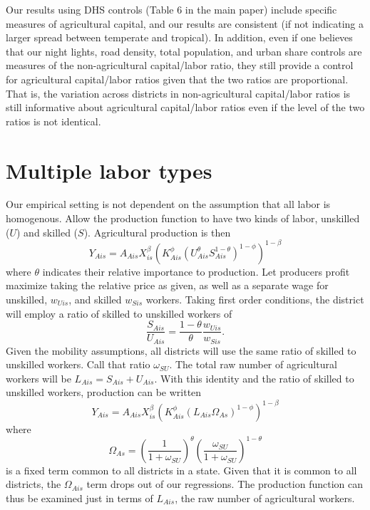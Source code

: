 \documentclass[11pt]{article}
\begin{document}
Our results using DHS controls (Table 6 in the main paper) include specific measures of agricultural capital, and our results are consistent (if not indicating a larger spread between temperate and tropical). In addition, even if one believes that our night lights, road density, total population, and urban share controls are measures of the non-agricultural capital/labor ratio, they still provide a control for agricultural capital/labor ratios given that the two ratios are proportional. That is, the variation across districts in non-agricultural capital/labor ratios is still informative about agricultural capital/labor ratios even if the level of the two ratios is not identical.

\section{Multiple labor types}
Our empirical setting is not dependent on the assumption that all labor is homogenous. Allow the production function to have two kinds of labor, unskilled ($U$) and skilled ($S$). Agricultural production is then
\begin{equation}
Y_{Ais} = A_{Ais} X_{is}^{\beta} \left(K_{Ais}^{\phi}(U_{Ais}^{\theta}S_{Ais}^{1-\theta})^{1-\phi}\right)^{1-\beta} 
\end{equation}
where $\theta$ indicates their relative importance to production. Let producers profit maximize taking the relative price as given, as well as a separate wage for unskilled, $w_{Uis}$, and skilled $w_{Sis}$ workers. Taking first order conditions, the district will employ a ratio of skilled to unskilled workers of
\begin{equation}
    \frac{S_{Ais}}{U_{Ais}} = \frac{1-\theta}{\theta}\frac{w_{Uis}}{w_{Sis}}.
\end{equation}
Given the mobility assumptions, all districts will use the same ratio of skilled to unskilled workers. Call that ratio $\omega_{SU}$. The total raw number of agricultural workers will be $L_{Ais} = S_{Ais} + U_{Ais}$. With this identity and the ratio of skilled to unskilled workers, production can be written
\begin{equation}
    Y_{Ais} = A_{Ais} X_{is}^{\beta} \left(K_{Ais}^{\phi}(L_{Ais}\Omega_{As})^{1-\phi}\right)^{1-\beta} 
\end{equation}
where
\begin{equation}
    \Omega_{As} = \left(\frac{1}{1+\omega_{SU}} \right)^{\theta} \left(\frac{\omega_{SU}}{1+\omega_{SU}} \right)^{1-\theta}
\end{equation}
is a fixed term common to all districts in a state. Given that it is common to all districts, the $\Omega_{Ais}$ term drops out of our regressions. The production function can thus be examined just in terms of $L_{Ais}$, the raw number of agricultural workers.
\end{document}
